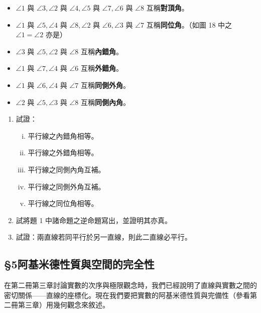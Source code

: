 \begin{itemize}[leftmargin=2em]
  \item $\angle 1$ 與 $\angle 3, \angle 2$ 與 $\angle 4, \angle 5$ 與 $\angle 7, \angle 6$ 與 $\angle 8$ 互稱\textbf{對頂角}。
  \item $\angle 1$ 與 $\angle 5, \angle 4$ 與 $\angle 8, \angle 2$ 與 $\angle 6, \angle 3$ 與 $\angle 7$ 互稱\textbf{同位角}。（如圖 18 中之 $\angle 1 = \angle 2$ 亦是）
  \item $\angle 3$ 與 $\angle 5, \angle 2$ 與 $\angle 8$ 互稱\textbf{內錯角}。
  \item $\angle 1$ 與 $\angle 7, \angle 4$ 與 $\angle 6$ 互稱\textbf{外錯角}。
  \item $\angle 1$ 與 $\angle 6, \angle 4$ 與 $\angle 7$ 互稱\textbf{同側外角}。
  \item $\angle 2$ 與 $\angle 5, \angle 3$ 與 $\angle 8$ 互稱\textbf{同側內角}。
\end{itemize}

\begin{enumerate}[1., leftmargin=2em]
  \item 試證：
  \begin{enumerate}[(i)]
    \item 平行線之內錯角相等。
    \item 平行線之外錯角相等。
    \item 平行線之同側內角互補。
    \item 平行線之同側外角互補。
    \item 平行線之同位角相等。
  \end{enumerate}
  \item 試將題 1 中諸命題之逆命題寫出，並證明其亦真。
  \item 試證：兩直線若同平行於另一直線，則此二直線必平行。
\end{enumerate}

\subsection*{\S 5\quad 阿基米德性質與空間的完全性}
\label{sec:b3s_a1_5}

在第二冊第三章討論實數的次序與極限觀念時，我們已經說明了直線與實數之間的密切關係——直線的座標化。現在我們要把實數的阿基米德性質與完備性（參看第二冊第三章）用幾何觀念來敘述。

